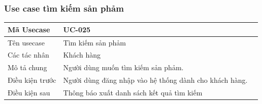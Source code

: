 \documentclass[12pt,a4paper]{article}
\begin{document}

    \subsubsection*{Use case tìm kiếm sản phảm}
    \begin{table}[H]
        \centering
        \begin{tabular}{|p{3.5cm}|p{11.5cm}|c|}
            \hline
            Mã Usecase      & UC-025                                                 \\
            \hline
            Tên usecase     & Tìm kiếm sản phảm                                      \\
            \hline
            Các tác nhân    & Khách hàng                                             \\
            \hline
            Mô tả chung     & Người dùng muốn tìm kiếm sản phảm.                     \\
            \hline

            Điều kiện trước & Người dùng đăng nhập vào hệ thống dành cho khách hàng. \\
            \hline

            Điều kiện sau   & Thông báo xuất danh sách kết quả tìm kiếm              \\
            \hline


\end{tabular}
\end{table}
\end{document}
